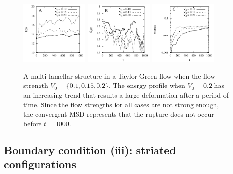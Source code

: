 \documentclass[aps,prl,preprint,groupedaddress]{revtex4-2}
\begin{document}
\begin{figure}
  \begin{center}
  \includegraphics[width=0.3\textwidth]{MTG_E.pdf}
   \includegraphics[width=0.3\textwidth]{MTG_LOP.pdf}
    \includegraphics[width=0.3\textwidth]{MTG_MSD.pdf}
  \end{center}
    \caption{\label{fig:BC2_TG}  A multi-lamellar structure in a Taylor-Green flow when the flow strength $V_0=\{0.1,0.15,0.2\}$. The energy profile when $V_0=0.2$ has an increasing trend that results a large deformation after a period of time. Since the flow strengths for all cases are not strong enough, the convergent MSD represents that the rupture does not occur before $t=1000$.}
\end{figure}



\subsection{Boundary condition (iii): striated configurations} 
\end{document}
